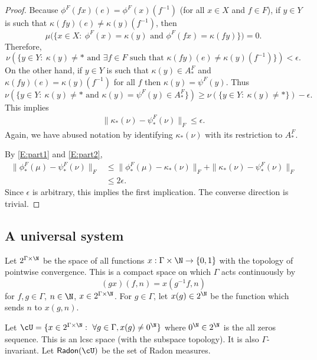 \documentclass[12pt]{article}
\theoremstyle{plain}
\theoremstyle{definition}
\theoremstyle{remark}
\newcommand{\G}{\Gamma}
\newcommand{\eps}{\epsilon}
\newcommand\Radon{\mathsf{Radon}}
\newcommand{\dee}{\textrm{d}}
\begin{document}
\begin{proof}
Because $\phi^F(fx)(e)=\phi^F(x)(f^{-1})$ (for all $x\in X$ and $f\in F$), if $y\in Y$ is such that $\kappa(fy)(e)\ne \kappa(y)(f^{-1})$, then 
$$\mu\big(\{x\in X:~ \phi^F(x)=\kappa(y) \textrm{ and } \phi^F(fx)=\kappa(fy)\}\big)=0.$$
Therefore,
$$\nu(\{y \in Y:~\kappa(y)\ne * \textrm{ and } \exists f \in F \textrm{ such that } \kappa(fy)(e)\ne \kappa(y)(f^{-1})\})<\eps.$$
On the other hand,  if $y\in Y$ is such that $\kappa(y) \in A_*^F$ and  $\kappa(fy)(e)=\kappa(y)(f^{-1})$ for all $f$ then $\kappa(y)=\psi^F(y)$. Thus
$$\nu(\{y \in Y:~\kappa(y)\ne * \textrm{ and } \kappa(y)=\psi^F(y)\in A_*^F\}) \ge \nu(\{y \in Y:~\kappa(y)\ne * \})-\eps.$$
This implies
\begin{align}\label{E:part2}
 \|\kappa_*(\nu) - \psi^F_*(\nu)\|_F \le \eps. 
\end{align}
Again, we have abused notation by identifying $\kappa_*(\nu)$ with its restriction to $A_*^F$. 

By \eqref{E:part1} and \eqref{E:part2},
\begin{align*}
    \|\phi^F_*(\mu) - \psi^F_*(\nu)\|_F &\le \|\phi^F_*(\mu) - \kappa_*(\nu)\|_F + \|\kappa_*(\nu) - \psi^F_*(\nu)\|_F \\
    &\le 2 \eps.
\end{align*}
Since $\eps$ is arbitrary, this implies the first implication. The converse direction is trivial.
\end{proof}

\subsection{A universal system}

Let $2^{\G\times \N}$ be the space of all functions $x:\G\times \N \to \{0,1\}$ with the topology of pointwise convergence. This is a compact space on which $\G$ acts continuously by
$$(gx)(f,n)=x(g^{-1}f,n)$$
for $f,g\in \G$, $n\in \N$, $x\in 2^{\G\times \N}$. For $g\in \G$, let $x(g)\in 2^\N$ be the function which sends $n$ to $x(g,n)$.


Let $\cU=\{x\in 2^{\G\times \N}:~\forall g\in \G, x(g)\ne 0^\N\}$ where $0^\N\in 2^\N$ is the all zeros sequence. This is an lcsc space (with the subspace topology). It is also $\G$-invariant. Let $\Radon(\cU)$ be the set of Radon measures.

\end{document}
